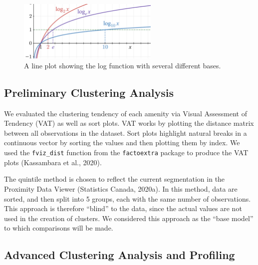 \documentclass[11pt, a4paper]{article}
\begin{document}
\begin{figure}[H]
\centering
\includegraphics[width=0.6\textwidth]{./distributions/logtransform.png}
\caption[Log-transform]{A line plot showing the log function with several different bases.}\label{logtransform}
\end{figure}







\subsection{Preliminary Clustering Analysis}


We evaluated the clustering tendency of each amenity via Visual Assessment of Tendency (VAT) as well as sort plots. VAT works by plotting the distance matrix between all observations in the dataset. Sort plots highlight natural breaks in a continuous vector by sorting the values and then plotting them by index. We used the \texttt{fviz\_dist} function from the \texttt{factoextra} package to produce the VAT plots (Kassambara et al., 2020).
\par
The quintile method is chosen to reflect the current segmentation in the Proximity Data Viewer (Statistics Canada, 2020a). In this method, data are sorted, and then split into 5 groups, each with the same number of observations.  This approach is  therefore ``blind'' to the data, since the actual values are not used in the creation of clusters. We considered this approach as the ``base model'' to which comparisons will be made.






\subsection{Advanced Clustering Analysis and Profiling}
\end{document}
